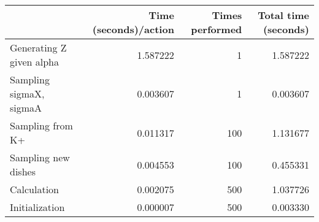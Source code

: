 \begin{tabular}{lrrr}
\toprule
{} &  Time (seconds)/action &  Times performed &  Total time (seconds) \\
\midrule
Generating Z given alpha &               1.587222 &                1 &              1.587222 \\
Sampling sigmaX, sigmaA  &               0.003607 &                1 &              0.003607 \\
Sampling from K+         &               0.011317 &              100 &              1.131677 \\
Sampling new dishes      &               0.004553 &              100 &              0.455331 \\
Calculation              &               0.002075 &              500 &              1.037726 \\
Initialization           &               0.000007 &              500 &              0.003330 \\
\bottomrule
\end{tabular}
